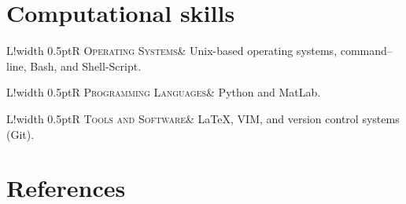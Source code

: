\documentclass[10pt]{article}
\newcommand\VRule{\color{lightgray}\vrule width 0.5pt}
\begin{document}

\vspace{.3cm}
\section*{Computational skills}
\vspace{.3cm}
\begin{tabular}{L!{\VRule}R}
\textsc{Operating Systems}& Unix-based 
operating systems, command--line, Bash, and Shell-Script. \\
\end{tabular}
\newline \noindent 
\newline \noindent
\begin{tabular}{L!{\VRule}R}
\textsc{Programming Languages}& Python and MatLab.  \\
\end{tabular}
\newline \noindent 
\newline \noindent
\begin{tabular}{L!{\VRule}R}
\textsc{Tools and Software}& LaTeX, VIM, and version control systems (Git). \\
\end{tabular}





\vspace{.5cm}
\section*{References}
\vspace{.3cm}
\end{document}
